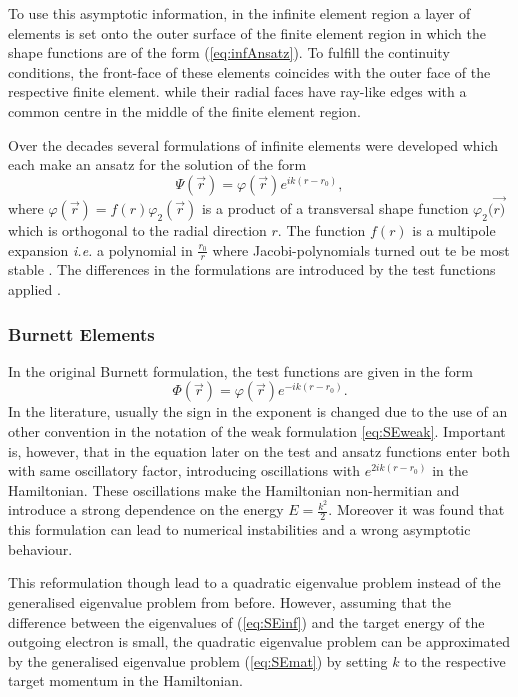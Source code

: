 To use this asymptotic information, in the infinite element region a layer of elements is set onto the outer surface of the finite element region in which the shape functions are of the form (\ref{eq:infAnsatz}).
To fulfill the continuity conditions, the front-face of these elements coincides with the outer face of the respective finite element. while their radial faces have ray-like edges with a common centre in the middle of the finite element region.

Over the decades several formulations of infinite elements were developed which each make an ansatz for the solution of the form
\begin{equation} \label{eq:Infansatz}
 \Psi(\vec{r}) = \varphi(\vec{r}) e^{ik(r-r_0)},
\end{equation}
where $\varphi(\vec{r})=f(r)\varphi_2(\vec{r})$ is a product of a transversal shape function $\varphi_2(\vec{r)}$ which is orthogonal to the radial direction $r$.
The function $f(r)$ is a multipole expansion \textit{i.e.} a polynomial in $\frac{r_0}{r}$ where Jacobi-polynomials turned out te be most stable \cite{dreyer_improved, infelNew}.
The differences in the formulations are introduced by the test functions applied \cite{Astley}.

\subsubsection{Burnett Elements}
In the original Burnett formulation, the test functions are given in the form
\begin{equation} \label{eq:BUelem}
 \Phi(\vec{r}) = \varphi(\vec{r}) e^{-ik(r-r_0)}.
\end{equation}
In the literature, usually the sign in the exponent is changed due to the use of an other convention in the notation of the weak formulation \ref{eq:SEweak}.
Important is, however, that in the equation later on the test and ansatz functions enter both with same oscillatory factor, introducing oscillations with $e^{2ik(r-r_0)}$ in the Hamiltonian.
These oscillations make the Hamiltonian non-hermitian and introduce a strong dependence on the energy $E=\frac{k^2}{2}$.
Moreover it was found that this formulation can lead to numerical instabilities \cite{Astley} and a wrong asymptotic behaviour.

This reformulation though lead to a quadratic eigenvalue problem instead of the generalised eigenvalue problem from before.
However, assuming that the difference between the eigenvalues of (\ref{eq:SEinf}) and the target energy of the outgoing electron is small, the quadratic eigenvalue problem can be approximated by the generalised eigenvalue problem (\ref{eq:SEmat}) by setting $k$ to the respective target momentum in the Hamiltonian.

